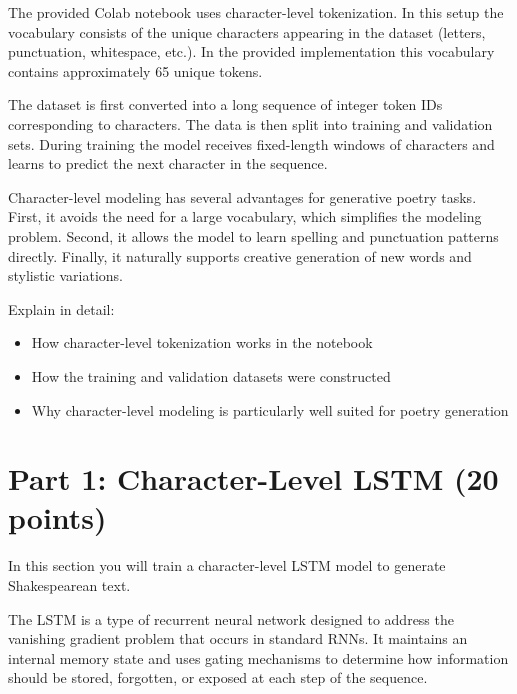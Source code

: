 The provided Colab notebook uses character-level tokenization. In this setup
the vocabulary consists of the unique characters appearing in the dataset
(letters, punctuation, whitespace, etc.). In the provided implementation this
vocabulary contains approximately 65 unique tokens.

The dataset is first converted into a long sequence of integer token IDs
corresponding to characters. The data is then split into training and validation
sets. During training the model receives fixed-length windows of characters
and learns to predict the next character in the sequence.

Character-level modeling has several advantages for generative poetry tasks.
First, it avoids the need for a large vocabulary, which simplifies the modeling
problem. Second, it allows the model to learn spelling and punctuation patterns
directly. Finally, it naturally supports creative generation of new words and
stylistic variations.

\begin{solution}

Explain in detail:

\begin{itemize}

\item How character-level tokenization works in the notebook

\item How the training and validation datasets were constructed

\item Why character-level modeling is particularly well suited for poetry generation

\end{itemize}

\end{solution}

\section{Part 1: Character-Level LSTM (20 points)}

In this section you will train a character-level LSTM model to generate
Shakespearean text.

The LSTM is a type of recurrent neural network designed to address the
vanishing gradient problem that occurs in standard RNNs. It maintains an
internal memory state and uses gating mechanisms to determine how information
should be stored, forgotten, or exposed at each step of the sequence.


